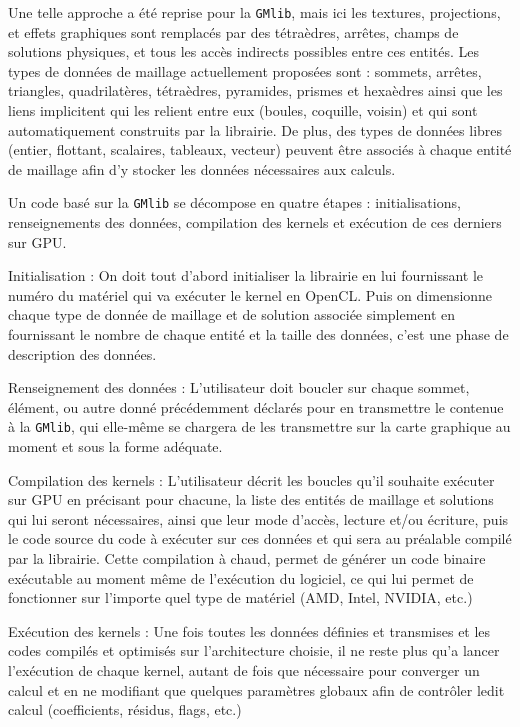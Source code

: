 \documentclass[a4paper,12pt]{article}
\begin{document}
Une telle approche a été reprise pour la {\tt GMlib}, mais ici les textures, projections, et effets graphiques sont remplacés par des tétraèdres, arrêtes, champs de solutions physiques, et tous les accès indirects possibles entre ces entités.
Les types de données de maillage actuellement proposées sont : sommets, arrêtes, triangles, quadrilatères, tétraèdres, pyramides, prismes et hexaèdres ainsi que les liens implicitent qui les relient entre eux (boules, coquille, voisin) et qui sont automatiquement construits par la librairie.
De plus, des types de données libres (entier, flottant, scalaires, tableaux, vecteur) peuvent être associés à chaque entité de maillage afin d'y stocker les données nécessaires aux calculs.

Un code basé sur la {\tt GMlib} se décompose en quatre étapes : initialisations, renseignements des données, compilation des kernels et exécution de ces derniers sur GPU.

Initialisation :
On doit tout d'abord initialiser la librairie en lui fournissant le numéro du matériel qui va exécuter le kernel en OpenCL.
Puis on dimensionne chaque type de donnée de maillage et de solution associée simplement en fournissant le nombre de chaque entité et la taille des données, c'est une phase de description des données.

Renseignement des données :
L'utilisateur doit boucler sur chaque sommet, élément, ou autre donné précédemment déclarés pour en transmettre le contenue à la {\tt GMlib}, qui elle-même se chargera de les transmettre sur la carte graphique au moment et sous la forme adéquate.

Compilation des kernels :
L'utilisateur décrit les boucles qu'il souhaite exécuter sur GPU en précisant pour chacune, la liste des entités de maillage et solutions qui lui seront nécessaires, ainsi que leur mode d'accès, lecture et/ou écriture, puis le code source du code à exécuter sur ces données et qui sera au préalable compilé par la librairie.
Cette compilation à chaud, permet de générer un code binaire exécutable au moment même de l'exécution du logiciel, ce qui lui permet de fonctionner sur l'importe quel type de matériel (AMD, Intel, NVIDIA, etc.)

Exécution des kernels :
Une fois toutes les données définies et transmises et les codes compilés et optimisés sur l'architecture choisie, il ne reste plus qu'a lancer l'exécution de chaque kernel, autant de fois que nécessaire pour converger un calcul et en ne modifiant que quelques paramètres globaux afin de contrôler ledit calcul (coefficients, résidus, flags, etc.)
\end{document}
